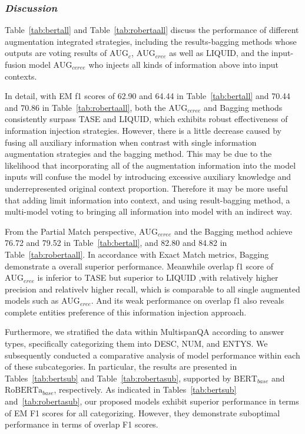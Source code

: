 \subsubsection{\textit{Discussion}}
Table~\ref{tab:bertall} and Table~\ref{tab:robertaall} discuss the performance of different augmentation integrated strategies, including the results-bagging methods whose outputs are voting results of $\text{AUG}_{c}$, $\text{AUG}_{eree}$ as well as LIQUID, and the input-fusion model $\text{AUG}_{ceree}$ who injects all kinds of information above into input contexts.

In detail, with EM f1 scores of 62.90 and 64.44 in Table~\ref{tab:bertall} and 70.44 and 70.86 in Table~\ref{tab:robertaall}, both the $\text{AUG}_{ceree}$ and Bagging methods consistently surpass TASE and LIQUID, which exhibits robust effectiveness of information injection strategies. However, there is a little decrease caused by fusing all auxiliary information when contrast with single information augmentation strategies and the bagging method. This may be due to the likelihood that incorporating all of the augmentation information into the model inputs will confuse the model by introducing excessive auxiliary knowledge and underrepresented original context proportion. Therefore it may be more useful that adding limit information into context, and using result-bagging method, a multi-model voting to bringing all information into model with an indirect way.

From the Partial Match perspective, $\text{AUG}_{ceree}$ and the Bagging method achieve 76.72 and 79.52 in Table~\ref{tab:bertall}, and 82.80 and 84.82 in Table~\ref{tab:robertaall}. In accordance with Exact Match metrics, Bagging demonstrate a overall superior performance. Meanwhile overlap f1 score of $\text{AUG}_{eree}$ is inferior to TASE but superior to LIQUID ,with relatively higher precision and relativelv higher recall, which  is comparable to all single augmented models such as $\text{AUG}_{eree}$. And its weak performance on overlap f1 also reveals complete entities preference of this information injection approach.

Furthermore, we stratified the data within MultispanQA according to answer types, specifically categorizing them into DESC, NUM, and ENTYS. We subsequently conducted a comparative analysis of model performance within each of these subcategories. In particular, the results are presented in Tables~\ref{tab:bertsub} and Table~\ref{tab:robertasub}, supported by $\text{BERT}_{base}$ and $\text{RoBERTa}_{base}$, respectively.
As indicated in Tables~\ref{tab:bertsub} and~\ref{tab:robertasub}, our proposed models exhibit superior performance in terms of EM F1 scores for all categorizing. However, they demonstrate suboptimal performance in terms of overlap F1 scores.



